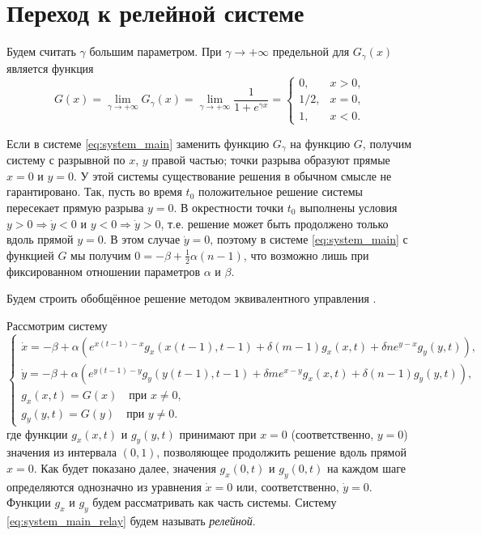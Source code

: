 \section{Переход к релейной системе}\label{sec:ch3/sect3}

Будем считать $\gamma$ большим параметром. При $\gamma \to +\infty$ предельной для $G_{\gamma}(x)$ является функция 
%
\begin{equation}
	\label{eq:relay_G_tilde}
	G(x) = \lim\limits_{\gamma \to +\infty}G_{\gamma}(x) = \lim\limits_{\gamma \to +\infty} \dfrac{1}{1 + e^{\gamma x}} = 
	\begin{cases}
		0, & x > 0,\\
		1/2, & x = 0,\\
		1, & x < 0.
	\end{cases}
\end{equation}

Если в системе \eqref{eq:system_main} заменить функцию $G_{\gamma}$ на функцию $G$, получим систему с разрывной по $x$, $y$ правой частью; точки разрыва образуют прямые $x = 0$ и $y = 0$. У этой системы существование решения в обычном смысле не гарантировано. Так, пусть во время $t_0$ положительное решение системы пересекает прямую разрыва $y = 0$. В окрестности точки $t_0$ выполнены условия $y > 0 \Rightarrow \dot{y} < 0$ и $y < 0 \Rightarrow \dot{y} > 0$, т.е. решение может быть продолжено только вдоль прямой $y = 0$. В этом случае $\dot{y} = 0$, поэтому в системе \eqref{eq:system_main} с функцией $G$ мы получим $0 = -\beta + \frac{1}{2} \alpha (n - 1)$, что возможно лишь при фиксированном отношении параметров $\alpha$ и $\beta$.

Будем строить обобщённое решение методом эквивалентного управления \cite[\S 4, с. 54]{Filippov1988}.

Рассмотрим систему
%
\small
\begin{equation}
	\label{eq:system_main_relay}
	\begin{cases}
		\dot{x} = -\beta + \alpha \left(e^{x(t - 1) - x} g_x(x(t - 1), t - 1) + \delta (m - 1) g_x(x, t) + \delta n e^{y - x} g_y(y, t)\right),\\
		\dot{y} = -\beta + \alpha \left(e^{y(t - 1) - y} g_y(y(t - 1), t - 1) + \delta m e^{x - y} g_x(x, t) + \delta (n - 1) g_y(y, t)\right),\\
		g_x(x, t) = G(x) \quad\text{при } x \neq 0,\\
		g_y(y, t) = G(y) \quad\text{при } y \neq 0.
	\end{cases}
\end{equation}
\normalsize
%
где функции $g_x(x, t)$ и $g_y(y, t)$ принимают при $x = 0$ (соответственно, $y = 0$) значения из интервала $(0, 1)$, позволяющее продолжить решение вдоль прямой $x = 0$. Как будет показано далее, значения $g_x(0, t)$ и $g_y(0, t)$ на каждом шаге определяются однозначно из уравнения $\dot{x} = 0$ или, соответственно, $\dot{y} = 0$. Функции $g_x$ и $g_y$ будем рассматривать как часть системы.
%
Систему \eqref{eq:system_main_relay} будем называть \emph{релейной}.

